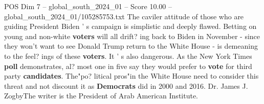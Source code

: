 \begin{textsample}{POS Dim 7 – global\_south\_2024\_01 – Score 10.00 – global\_south\_2024\_01/105285753.txt}
The caviler attitude of those who are guiding President Biden ' s campaign is simplistic and deeply flawed.
Betting on young and non-white \textbf{voters} will all drift? ing back to Biden in November - since they won't want to see Donald Trump return to the White House - is demeaning to the feel? ings of these \textbf{voters}.
It ' s also dangerous.
As the New York Times \textbf{poll} demonstrates, al? most one in five say they would prefer to \textbf{vote} for third party \textbf{candidates}.
The"po? litical pros"in the White House need to consider this threat and not discount it as \textbf{Democrats} did in 2000 and 2016.
Dr.
James J.
ZogbyThe writer is the President of Arab American Institute.

\end{textsample}
